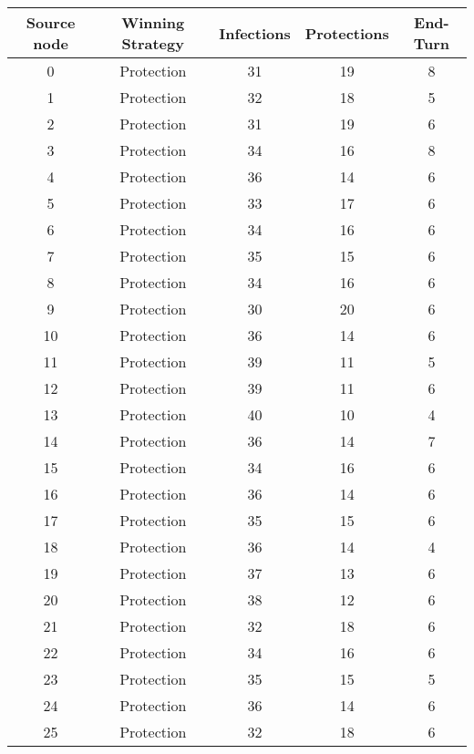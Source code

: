 \documentclass[results.tex]{subfiles}
\begin{document}
\begin{center}
  \begin{tabular}{| c || c | c | c | c |}
    \hline
    {\bfseries Source node} & {\bfseries Winning Strategy} & {\bfseries Infections} & {\bfseries Protections} & {\bfseries End-Turn} \\  %
    \hline\hline
    0 & Protection & 31 & 19 & 8 \\ 
    \hline
    1 & Protection & 32 & 18 & 5 \\ 
    \hline
    2 & Protection & 31 & 19 & 6 \\ 
    \hline
    3 & Protection & 34 & 16 & 8 \\ 
    \hline
    4 & Protection & 36 & 14 & 6 \\ 
    \hline
    5 & Protection & 33 & 17 & 6 \\ 
    \hline
    6 & Protection & 34 & 16 & 6 \\ 
    \hline
    7 & Protection & 35 & 15 & 6 \\ 
    \hline
    8 & Protection & 34 & 16 & 6 \\ 
    \hline
    9 & Protection & 30 & 20 & 6 \\ 
    \hline
    10 & Protection & 36 & 14 & 6 \\ 
    \hline
    11 & Protection & 39 & 11 & 5 \\ 
    \hline
    12 & Protection & 39 & 11 & 6 \\ 
    \hline
    13 & Protection & 40 & 10 & 4 \\ 
    \hline
    14 & Protection & 36 & 14 & 7 \\ 
    \hline
    15 & Protection & 34 & 16 & 6 \\ 
    \hline
    16 & Protection & 36 & 14 & 6 \\ 
    \hline
    17 & Protection & 35 & 15 & 6 \\ 
    \hline
    18 & Protection & 36 & 14 & 4 \\ 
    \hline
    19 & Protection & 37 & 13 & 6 \\ 
    \hline
    20 & Protection & 38 & 12 & 6 \\ 
    \hline
    21 & Protection & 32 & 18 & 6 \\ 
    \hline
    22 & Protection & 34 & 16 & 6 \\ 
    \hline
    23 & Protection & 35 & 15 & 5 \\ 
    \hline
    24 & Protection & 36 & 14 & 6 \\ 
    \hline
    25 & Protection & 32 & 18 & 6 \\ 

\end{tabular}
\end{center}
\end{document}
